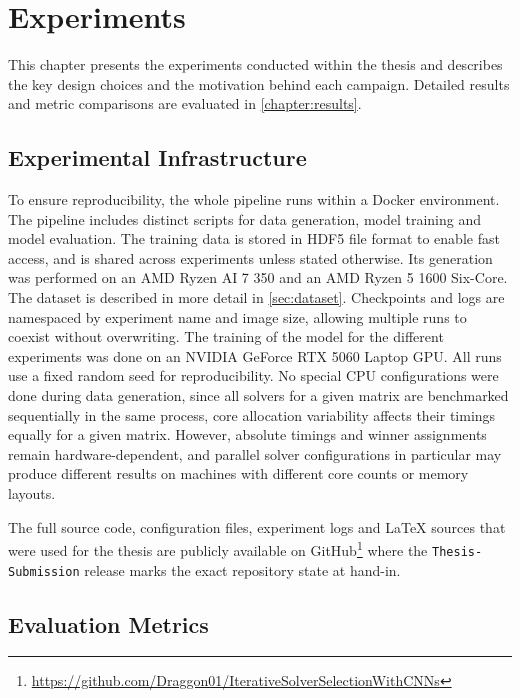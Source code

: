 
\chapter{Experiments}\label{chapter:experiments}

This chapter presents the experiments conducted within the thesis and describes the key design choices
and the motivation behind each campaign.
Detailed results and metric comparisons are evaluated in \autoref{chapter:results}.

\section{Experimental Infrastructure}\label{sec:infra}

To ensure reproducibility, the whole pipeline runs within a Docker environment.
The pipeline includes distinct scripts for data generation, model training and model evaluation.
The training data is stored in HDF5 file format to enable fast access, and is shared across experiments unless stated otherwise.
Its generation was performed on an AMD Ryzen AI 7 350 and an AMD Ryzen 5 1600 Six-Core. The dataset is described in more detail in \autoref{sec:dataset}.
Checkpoints and logs are namespaced by experiment name and image size, allowing multiple runs to coexist without overwriting.
The training of the model for the different experiments was done on an NVIDIA GeForce RTX 5060 Laptop GPU.
All runs use a fixed random seed for reproducibility.
No special CPU configurations were done during data generation, since all solvers for a given matrix are benchmarked sequentially in the same process, core allocation variability affects their timings equally for a given matrix.
However, absolute timings and winner assignments remain hardware-dependent, and parallel solver configurations in particular may produce different results on machines with different core counts or memory layouts.

The full source code, configuration files, experiment logs and LaTeX sources that were used for the thesis are publicly available on GitHub\footnote{\url{https://github.com/Draggon01/IterativeSolverSelectionWithCNNs}}
where the \texttt{Thesis-Submission} release marks the exact repository state at hand-in.

\section{Evaluation Metrics}\label{sec:metrics}

